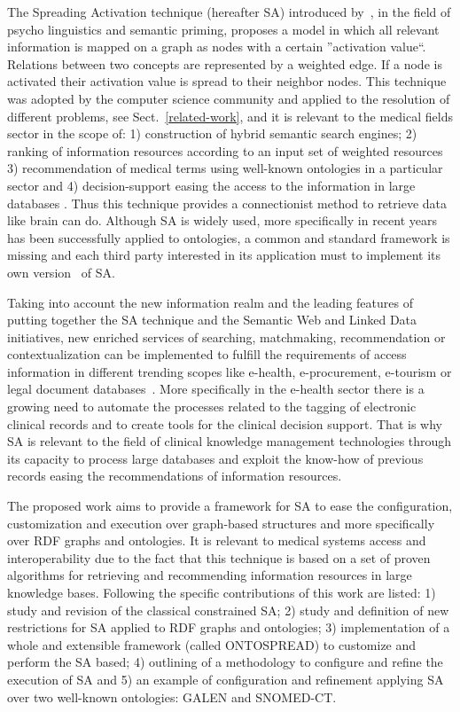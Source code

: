 The Spreading Activation technique (hereafter SA) introduced by~\cite{Collins_Loftus_1975}, in the field of 
psycho linguistics and semantic priming, proposes a model in which all relevant information is mapped
on a graph as nodes with a certain ''activation value``. Relations between two concepts
are represented by a weighted edge. If a node is activated their activation value is spread
to their neighbor nodes. This technique was adopted by the computer science community and applied
to the resolution of different problems, see Sect.~\ref{related-work}, and it is relevant to
the medical fields sector in the scope of: 1) construction of hybrid semantic search engines;  2) ranking of
information resources according to an input set of weighted resources 3) recommendation of medical terms using
well-known ontologies in a particular sector and 4) decision-support easing the access to the information
in large databases . Thus this technique provides a connectionist method to retrieve data like brain can do. 
Although SA is widely used, more specifically in recent years has been successfully applied 
to ontologies, a common and standard framework is missing and each third party interested in its application
 must to implement its own version~\cite{SpreadingLarkc} of SA.

Taking into account the new information realm and the leading features of putting together 
the SA technique and the Semantic Web and Linked Data initiatives, new enriched services of searching, 
matchmaking, recommendation or contextualization can be implemented to fulfill the requirements
of access information in different trending scopes like e-health, e-procurement, e-tourism or legal 
document databases~\cite{bopaEstonia}. More specifically in the e-health sector there 
is a growing need to automate the processes related to the tagging of electronic clinical records and to create 
tools for the clinical decision support. That is why SA is relevant to the field of clinical knowledge management 
technologies through its capacity to process large databases and exploit the know-how
of previous records easing the recommendations of information resources.


The proposed work aims to provide a framework for SA to ease the configuration, customization 
and execution over graph-based structures and more specifically over RDF graphs and ontologies. It is relevant
to medical systems access and interoperability due to the fact that this technique is based on
a set of proven algorithms for retrieving and recommending information resources in large knowledge bases. 
Following the specific contributions of this work are listed: 1) study and revision of the classical constrained SA;
2) study and definition of new restrictions for SA applied to RDF graphs and ontologies; 
3) implementation of a whole and extensible framework (called ONTOSPREAD) to customize 
and perform the SA based; 4) outlining of a methodology to configure and refine the execution of SA and 
5) an example of configuration and refinement applying SA over two well-known ontologies: GALEN and SNOMED-CT.


